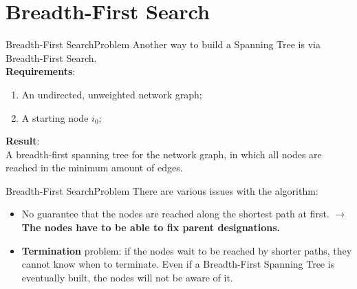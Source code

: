\documentclass[pdf]{beamer}
\begin{document}
\section{Breadth-First Search}
\begin{frame}{Breadth-First Search}{Problem}
	Another way to build a Spanning Tree is via Breadth-First Search. \\
    \vspace{12pt}
    \pause
    \textbf{Requirements}:
    \begin{enumerate}
        \item An undirected, unweighted network graph; \pause
        \item A starting node $i_0$; \pause
    \end{enumerate}
    \vspace{12pt}
    \textbf{Result}: \\ \pause
    A breadth-first spanning tree for the network graph, in which all nodes are reached in the minimum amount of edges.
\end{frame}

\begin{frame}{Breadth-First Search}{Problem}
    There are various issues with the algorithm: \pause
    \begin{itemize}
        \item No guarantee that the nodes are reached along the shortest path at first. \pause $\to$ \textbf{The nodes have to be able to fix parent designations.} \pause
        \item \textbf{Termination} problem: if the nodes wait to be reached by shorter paths, they cannot know when to terminate. Even if a Breadth-First Spanning Tree is eventually built, the nodes will not be aware of it.
    \end{itemize}
\end{frame}
\end{document}
